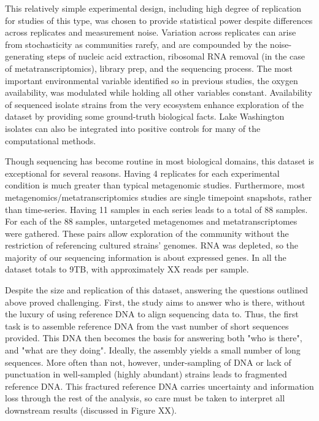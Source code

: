 This relatively simple experimental design, including high degree of replication for studies of this type, was chosen to provide statistical power despite differences across replicates and measurement noise.
Variation across replicates can arise from stochasticity as communities rarefy, and are compounded by the noise-generating steps of nucleic acid extraction, ribosomal RNA removal (in the case of metatranscriptomics), library prep, and the sequencing process.
The most important environmental variable identified so in previous studies, the oxygen availability, was modulated while holding all other variables constant.
Availability of sequenced isolate strains from the very ecosystem enhance exploration of the dataset by providing some ground-truth biological facts.
Lake Washington isolates can also be integrated into positive controls for many of the computational methods.

Though sequencing has become routine in most biological domains, this dataset is exceptional for several reasons.
Having 4 replicates for each experimental condition is much greater than typical metagenomic studies.
Furthermore, most metagenomics/metatranscriptomics studies are single timepoint snapshots, rather than time-series.
Having 11 samples in each series leads to a total of 88 samples.
For each of the 88 samples, untargeted metagenomes and metatranscriptomes were gathered.
These pairs allow exploration of the community without the restriction of referencing cultured strains' genomes.
RNA was depleted, so the majority of our sequencing information is about expressed genes.
In all the dataset totals to 9TB, with approximately XX reads per sample.

Despite the size and replication of this dataset, answering the questions outlined above proved challenging.
First, the study aims to answer who is there, without the luxury of using reference DNA to align sequencing data to.
Thus, the first task is to assemble reference DNA from the vast number of short sequences provided.
This DNA then becomes the basis for answering both "who is there", and "what are they doing".
Ideally, the assembly yields a small number of long sequences.
More often than not, however, under-sampling of DNA or lack of punctuation in well-sampled (highly abundant) strains leads to fragmented reference DNA.
This fractured reference DNA carries uncertainty and information loss through the rest of the analysis, so care must be taken to interpret all downstream results (discussed in Figure XX).

